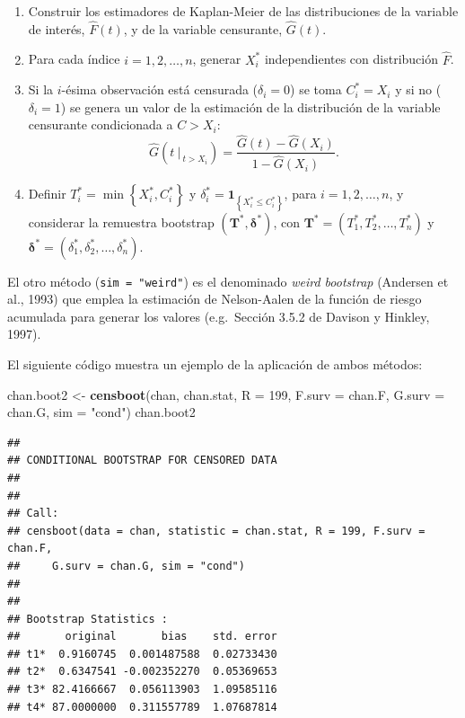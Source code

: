 \documentclass[]{book}
\newenvironment{Shaded}{\begin{snugshade}}{\end{snugshade}}
\newcommand{\KeywordTok}[1]{\textcolor[rgb]{0.13,0.29,0.53}{\textbf{#1}}}
\newcommand{\DataTypeTok}[1]{\textcolor[rgb]{0.13,0.29,0.53}{#1}}
\newcommand{\DecValTok}[1]{\textcolor[rgb]{0.00,0.00,0.81}{#1}}
\newcommand{\StringTok}[1]{\textcolor[rgb]{0.31,0.60,0.02}{#1}}
\newcommand{\NormalTok}[1]{#1}
\theoremstyle{definition}
\theoremstyle{definition}
\theoremstyle{definition}
\theoremstyle{remark}
\begin{document}
\begin{enumerate}
\def\labelenumi{\arabic{enumi}.}
\item
  Construir los estimadores de Kaplan-Meier de las distribuciones de la
  variable de interés, \(\hat{F}\left( t \right)\), y de la variable
  censurante, \(\hat{G}\left( t \right)\).
\item
  Para cada índice \(i=1,2,\ldots ,n\), generar \(X_i^{\ast}\)
  independientes con distribución \(\hat{F}\).
\item
  Si la \(i\)-ésima observación está censurada (\(\delta_i=0\)) se toma
  \(C_i^{\ast}=X_i\) y si no (\(\delta_i=1\)) se genera un valor de la
  estimación de la distribución de la variable censurante condicionada a
  \(C > X_i\):
  \[\hat G \left(\left. t \ \right\vert_{\ t > X_i} \right) 
  = \frac{\hat G(t) - \hat G(X_i)}{1- \hat G(X_i)}.\]
\item
  Definir \(T_i^{\ast}=\min \left\{ X_i^{\ast},C_i^{\ast}\right\}\) y
  \(\delta_i^{\ast}=\mathbf{1}_{\left\{ X_i^{\ast}\leq C_i^{\ast}\right\}}\),
  para \(i = 1, 2, \ldots, n\), y considerar la remuestra bootstrap
  \(\left( \mathbf{T}^{\ast},\boldsymbol{\delta}^{\ast}\right)\), con
  \(\mathbf{T}^{\ast}=\left( T_1^{\ast},T_2^{\ast}, \ldots, T_n^{\ast} \right)\)
  y
  \(\boldsymbol{\delta}^{\ast} = \left( \delta_1^{\ast}, \delta_2^{\ast},\ldots ,\delta_n^{\ast} \right)\).
\end{enumerate}

El otro método (\texttt{sim\ =\ "weird"}) es el denominado \emph{weird
bootstrap} (Andersen et al., 1993) que emplea la estimación de
Nelson-Aalen de la función de riesgo acumulada para generar los valores
(e.g.~Sección 3.5.2 de Davison y Hinkley, 1997).

El siguiente código muestra un ejemplo de la aplicación de ambos
métodos:

\begin{Shaded}
\begin{Highlighting}[]
\NormalTok{chan.boot2 <-}\StringTok{ }\KeywordTok{censboot}\NormalTok{(chan, chan.stat, }\DataTypeTok{R =} \DecValTok{199}\NormalTok{, }\DataTypeTok{F.surv =}\NormalTok{ chan.F, }
                  \DataTypeTok{G.surv =}\NormalTok{ chan.G, }\DataTypeTok{sim =} \StringTok{"cond"}\NormalTok{)}
\NormalTok{chan.boot2}
\end{Highlighting}
\end{Shaded}

\begin{verbatim}
## 
## CONDITIONAL BOOTSTRAP FOR CENSORED DATA
## 
## 
## Call:
## censboot(data = chan, statistic = chan.stat, R = 199, F.surv = chan.F, 
##     G.surv = chan.G, sim = "cond")
## 
## 
## Bootstrap Statistics :
##       original       bias    std. error
## t1*  0.9160745  0.001487588  0.02733430
## t2*  0.6347541 -0.002352270  0.05369653
## t3* 82.4166667  0.056113903  1.09585116
## t4* 87.0000000  0.311557789  1.07687814
\end{verbatim}
\end{document}
